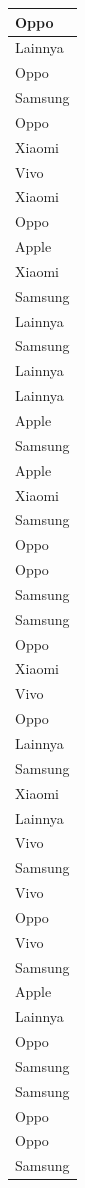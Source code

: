 \documentclass[
  letterpaper,
  DIV=11,
  numbers=noendperiod]{scrartcl}
\begin{document}
\begin{table}
\begin{tabular}[t]{l}
\hline
Oppo\\
\hline
Lainnya\\
\hline
Oppo\\
\hline
Samsung\\
\hline
Oppo\\
\hline
Xiaomi\\
\hline
Vivo\\
\hline
Xiaomi\\
\hline
Oppo\\
\hline
Apple\\
\hline
Xiaomi\\
\hline
Samsung\\
\hline
Lainnya\\
\hline
Samsung\\
\hline
Lainnya\\
\hline
Lainnya\\
\hline
Apple\\
\hline
Samsung\\
\hline
Apple\\
\hline
Xiaomi\\
\hline
Samsung\\
\hline
Oppo\\
\hline
Oppo\\
\hline
Samsung\\
\hline
Samsung\\
\hline
Oppo\\
\hline
Xiaomi\\
\hline
Vivo\\
\hline
Oppo\\
\hline
Lainnya\\
\hline
Samsung\\
\hline
Xiaomi\\
\hline
Lainnya\\
\hline
Vivo\\
\hline
Samsung\\
\hline
Vivo\\
\hline
Oppo\\
\hline
Vivo\\
\hline
Samsung\\
\hline
Apple\\
\hline
Lainnya\\
\hline
Oppo\\
\hline
Samsung\\
\hline
Samsung\\
\hline
Oppo\\
\hline
Oppo\\
\hline
Samsung\\

\end{tabular}
\end{table}
\end{document}
